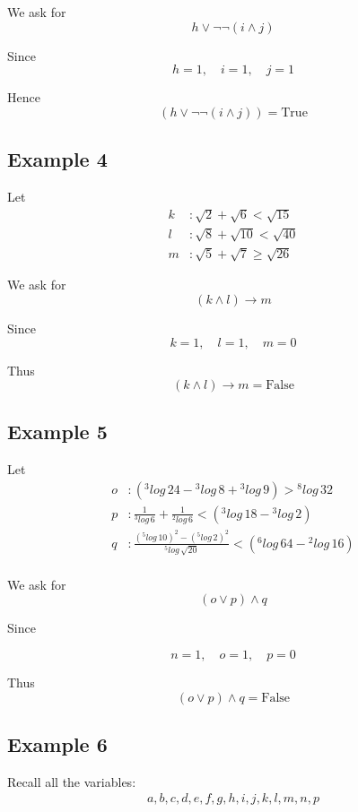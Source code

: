 \documentclass[12pt,a4paper,openany]{article}
\begin{document}
We ask for
\[
h \lor \neg \neg (i \land j)
\]

Since
\[
h = 1, \quad i = 1, \quad j = 1
\]

Hence
\[
\boxed{(h \lor \neg \neg (i \land j)) = \text{True}}
\]

\subsection{Example 4}\label{example-4}

Let
\[
\begin{aligned}
k &: \sqrt{2} + \sqrt{6} < \sqrt{15} \\
l &: \sqrt{8} + \sqrt{10} < \sqrt{40} \\
m &: \sqrt{5} + \sqrt{7} \ge \sqrt{26}
\end{aligned}
\]

We ask for
\[
(k \land l) \to m
\]

Since
\[
k = 1, \quad l = 1, \quad m = 0
\]

Thus
\[
\boxed{(k \land l) \to m = \text{False}}
\]

\subsection{Example 5}\label{example-5}

Let
\[
\begin{aligned}
o &: \left({}^{3}\!log\,24 - {}^{3}\!log\,8 + {}^{3}\!log\,9 \right) > {}^{8}\!log\,32\\
p &:  \frac{1}{{}^{3}\!log\,6} + \frac{1}{{}^{2}\!log\,6} <  \left({}^{3}\!log\,18 - {}^{3}\!log\,2 \right)\\ 
q &:  \frac{({}^{5}\!log\,10)^2 - ({}^{5}\!log\,2)^2 }{{}^{5}\!log\,\sqrt{20}} < \left({}^{6}\!log\,64 - {}^{2}\!log\,16 \right) \\ 
\end{aligned}
\]

We ask for
\[
(o \lor p) \land q
\]

Since

\[
n = 1, \quad o = 1, \quad p = 0
\]

Thus
\[
\boxed{(o \lor p) \land q = \text{False}}
\]

\newpage

\subsection{Example 6}\label{example-6}

Recall all the variables:
\[
\begin{aligned}
a, b, c, d, e, f, g, h, i, j, k, l, m, n, p
\end{aligned}
\]
\end{document}
